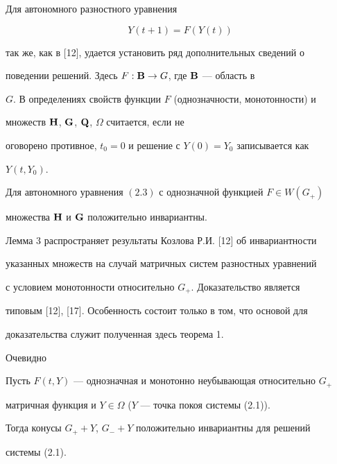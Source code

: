 Для автономного разностного уравнения


\begin{equation}


Y(t+1)=F(Y(t))


\end{equation}


так же, как в [12], удается установить ряд дополнительных сведений о


поведении решений. Здесь $F:\bold B\to G$, где $\bold B$ --- область в


$G$. В определениях свойств функции $F$ (однозначности, монотонности) и


множеств $\bold H$, $\bold G$, $\bold Q$, $\Omega$ считается, если не


оговорено противное, $t_0=0$ и решение с $Y(0)=Y_0$ записывается как


$Y(t,Y_0)$.





\begin{lem}


Для автономного уравнения $(2.3)$ с однозначной функцией $F\in W(G_+)$


множества $\bold H$ и $\bold G$ положительно инвариантны.


\end{lem}





Лемма 3 распространяет результаты Козлова Р.И. [12] об инвариантности


указанных множеств на случай матричных систем разностных уравнений


с условием монотонности относительно $G_+$. Доказательство является


типовым [12], [17]. Особенность состоит только в том, что основой для


доказательства служит полученная здесь теорема 1.





Очевидно





\begin{cor}


Пусть $F(t,Y)$ --- однозначная и монотонно неубывающая относительно $G_+$


матричная функция и $Y\in\Omega$ ($Y$ --- точка покоя системы (2.1)).


Тогда конусы $G_++Y$, $G_-+Y$ положительно инвариантны для решений


системы (2.1).


\end{cor}





